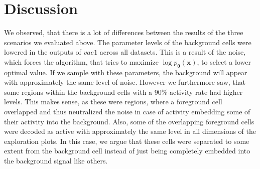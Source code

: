 \documentclass[12pt]{report}
\theoremstyle{definition}
\begin{document}
\section{Discussion}
We observed, that there is a lot of differences between the results of the three scenarios we evaluated above.
The parameter levels of the background cells were lowered in the outputs of $vae1$ across all datasets. This is a result of the noise, which forces the algorithm, that tries to maximize $\log p_{\pmb{\theta}}(\mathbf{x})$, to select a lower optimal value. If we sample with these parameters, the background will appear with approximately the same level of noise. However we furthermore saw, that some regions within the background cells with a 90\%-activity rate had higher levels. This makes sense, as these were regions, where a foreground cell overlapped and thus neutralized the noise in case of activity embedding some of their activity into the background. Also, some of the overlapping foreground cells were decoded as active with approximately the same level in all dimensions of the exploration plots. In this case, we argue that these cells were separated to some extent from the background cell instead of just being completely embedded into the background signal like others.
\end{document}
